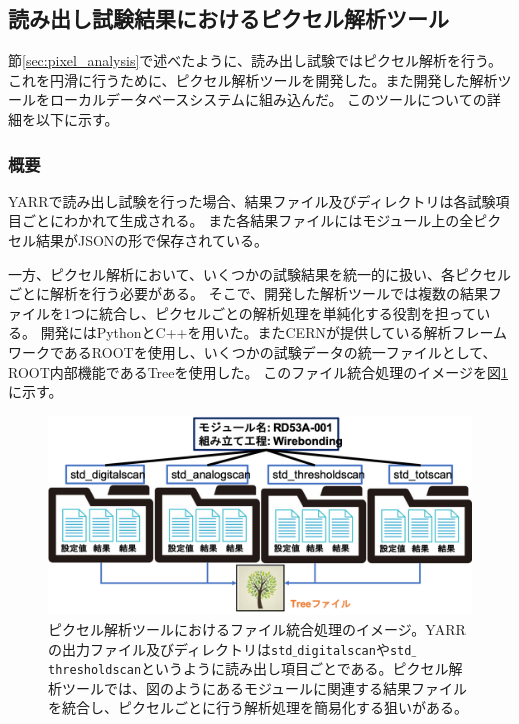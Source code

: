 \clearpage

\newpage
\subsection{読み出し試験結果におけるピクセル解析ツール}
節\ref{sec:pixel_analysis}で述べたように、読み出し試験ではピクセル解析を行う。
これを円滑に行うために、ピクセル解析ツールを開発した。また開発した解析ツールをローカルデータベースシステムに組み込んだ。
このツールについての詳細を以下に示す。

\subsubsection{概要}
YARRで読み出し試験を行った場合、結果ファイル及びディレクトリは各試験項目ごとにわかれて生成される。
また各結果ファイルにはモジュール上の全ピクセル結果がJSONの形で保存されている。

一方、ピクセル解析において、いくつかの試験結果を統一的に扱い、各ピクセルごとに解析を行う必要がある。
そこで、開発した解析ツールでは複数の結果ファイルを1つに統合し、ピクセルごとの解析処理を単純化する役割を担っている。
開発にはPythonとC++を用いた。またCERNが提供している解析フレームワークであるROOT\cite{4-5}を使用し、いくつかの試験データの統一ファイルとして、ROOT内部機能であるTreeを使用した。
このファイル統合処理のイメージを図\ref{analysis_tool_motivation}に示す。

\begin{figure}[bpt]\centering
\includegraphics[width=12cm]{analysis_tool_motivation}
\caption[ピクセル解析ツールにおけるファイル統合処理のイメージ]{ピクセル解析ツールにおけるファイル統合処理のイメージ。YARRの出力ファイル及びディレクトリは\texttt{std$\_$digitalscan}や\texttt{std$\_$thresholdscan}というように読み出し項目ごとである。ピクセル解析ツールでは、図のようにあるモジュールに関連する結果ファイルを統合し、ピクセルごとに行う解析処理を簡易化する狙いがある。}
\label{analysis_tool_motivation}
\end{figure}

